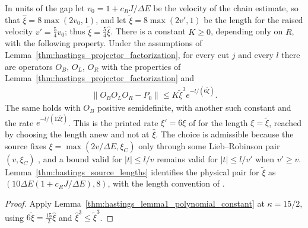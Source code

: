 \begin{lemma}
    \label{thm:hastings_lemma1_endpoint}
    \leanok
    In units of the gap let $v_0=1+c_RJ/\Delta E$ be the velocity of the
    chain estimate, so that $\hat\xi=8\max(2v_0,1)$, and let
    $\tilde\xi=8\max(2v',1)$ be the length for the raised velocity
    $v'=\tfrac54v_0$; thus $\tilde\xi=\tfrac54\hat\xi$. There is a constant
    $K\ge0$, depending only on $R$, with the following property. Under the
    assumptions of Lemma~\ref{thm:hastings_projector_factorization}, for
    every cut $j$ and every $l$ there are operators $O_B$, $O_L$, $O_R$ with
    the properties of Lemma~\ref{thm:hastings_projector_factorization} and
    \begin{align}
        \|O_BO_LO_R-P_0\|\le K\tilde\xi^3e^{-l/(6\tilde\xi)}.
        \label{eq:hastings_lemma1_endpoint}
    \end{align}
    The same holds with $O_B$ positive semidefinite, with another such
    constant and the rate $e^{-l/(12\tilde\xi)}$. This is the printed rate
    $\xi'=6\xi$ of \cite[lines 141--142]{Hastings2007AreaLaw} for the length
    $\xi=\tilde\xi$, reached by choosing the length anew and not at
    $\hat\xi$. The choice is admissible because the source fixes
    $\xi=\max(2v/\Delta E,\xi_C)$ only through some Lieb--Robinson pair
    $(v,\xi_C)$ \cite[lines 96--112]{Hastings2007AreaLaw}, and a bound valid
    for $|t|\le l/v$ remains valid for $|t|\le l/v'$ when
    $v'\ge v$. Lemma~\ref{thm:hastings_source_lengths} identifies the
    physical pair for $\tilde\xi$ as
    $(10\Delta E(1+c_RJ/\Delta E),8)$, with the length convention of
    \cite{gap:hastings07_lemma1_decay_length}.
\end{lemma}
\begin{proof}\leanok
    Apply Lemma~\ref{thm:hastings_lemma1_polynomial_constant} at
    $\kappa=15/2$, using $6\tilde\xi=\tfrac{15}2\hat\xi$ and
    $\hat\xi^3\le\tilde\xi^3$.
\end{proof}

